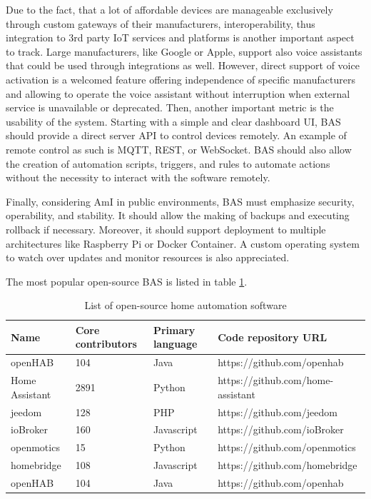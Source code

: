 \documentclass[fleqn,10pt]{olplainarticle}
\begin{document}
\vskip10pt

Due to the fact, that a lot of affordable devices are manageable exclusively through custom gateways of their manufacturers, interoperability, thus integration to 3rd party IoT services and platforms is another important aspect to track. Large manufacturers, like Google or Apple, support also voice assistants that could be used through integrations as well. However, direct support of voice activation is a welcomed feature offering independence of specific manufacturers and allowing to operate the voice assistant without interruption when external service is unavailable or deprecated.
Then, another important metric is the usability of the system. Starting with a simple and clear dashboard UI, BAS should provide a direct server API to control devices remotely. An example of remote control as such is MQTT, REST, or WebSocket. BAS should also allow the creation of automation scripts, triggers, and rules to automate actions without the necessity to interact with the software remotely.

\vskip10pt

Finally, considering AmI in public environments, BAS must emphasize security, operability, and stability. It should allow the making of backups and executing rollback if necessary. Moreover, it should support deployment to multiple architectures like Raspberry Pi or Docker Container. A custom operating system to watch over updates and monitor resources is also appreciated.

\vskip10pt

The most popular open-source BAS is listed in table \ref{tab:table1}.

\begin{table}[h]
\begin{tabular}{p{2.5cm} p{2cm} p{2cm} p{5cm}} \toprule
    Name & Core contributors & Primary language & Code repository URL  \\ \midrule
    openHAB & 104 & Java & https://github.com/openhab \\ \bottomrule
    Home Assistant & 2891 & Python & https://github.com/home-assistant \\ \bottomrule
    jeedom & 128 & PHP & https://github.com/jeedom \\ \bottomrule
    ioBroker & 160 & Javascript & https://github.com/ioBroker \\ \bottomrule
    openmotics & 15 & Python & https://github.com/openmotics \\ \bottomrule
    homebridge & 108 & Javascript & https://github.com/homebridge \\ \bottomrule

    openHAB & 104 & Java & https://github.com/openhab  \\ \bottomrule
    \end{tabular}
    \caption{\label{tab:table1}List of open-source home automation software}
    \end{table}
\end{document}
